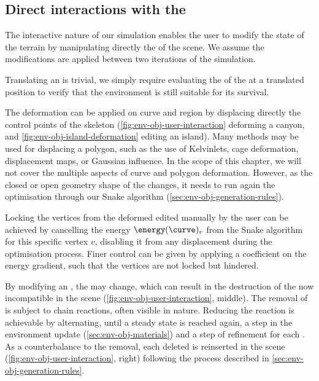 \subsection{Direct interactions with the }
\label{sec:env-obj-manual-interaction}
The interactive nature of our simulation enables the user to modify the state of the terrain by manipulating directly the  of the scene. We assume the modifications are applied between two iterations of the simulation.

Translating an  is trivial, we simply require evaluating the  of the  at a translated position to verify that the environment is still suitable for its survival.

The deformation  can be applied on curve and region  by displacing directly the control points of the skeleton (\cref{fig:env-obj-user-interaction} deforming a canyon, and \cref{fig:env-obj-island-deformation} editing an island). Many methods may be used for displacing a polygon, such as the use of Kelvinlets, cage deformation, displacement maps, or Gaussian influence. In the scope of this chapter, we will not cover the multiple aspects of curve and polygon deformation. However, as the closed or open geometry shape of the  changes, it needs to run again the  optimisation through our Snake algorithm (\cref{sec:env-obj-generation-rules}).

Locking the vertices from the deformed  edited manually by the user can be achieved by cancelling the energy $\energy(\curve)_v$ from the Snake algorithm for this specific vertex $v$, disabling it from any displacement during the optimisation process. Finer control can be given by applying a coefficient on the energy gradient, such that the vertices are not locked but hindered.

By modifying an , the  may change, which can result in the destruction of the now incompatible  in the scene (\cref{fig:env-obj-user-interaction}, middle). The removal of  is subject to chain reactions, often visible in nature. Reducing the reaction is achievable by alternating, until a steady state is reached again, a step in the environment update (\cref{sec:env-obj-materials}) and a step of  refinement for each . As a counterbalance to the removal, each deleted  is reinserted in the scene (\cref{fig:env-obj-user-interaction}, right) following the process described in \cref{sec:env-obj-generation-rules}.


